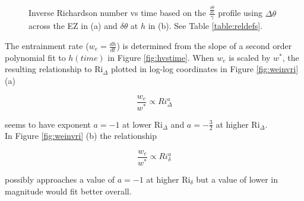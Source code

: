 \begin{figure}[htbp]

\begin{minipage}[b]{0.5\linewidth}
         
        \\
        \end{minipage}             
\quad
\begin{minipage}[b]{0.5\linewidth}
        \\
       
       \end{minipage}
        \caption[Richardson numbers based on $\frac{\frac{\partial \overline{\theta}}{\partial z}}{\gamma}$]{Inverse Richardson number vs time based on the $\frac{\frac{\partial \overline{\theta}}{\partial z}}{\gamma}$
profile using $\Delta \theta$ across the \acs{EZ} in (a) and $\delta \theta$ at $h$ in (b).  See Table \ref{table:reldefs}.}
        \label{fig:invristime}
\end{figure}

\clearpage

The entrainment rate ($w_{e}= \frac{dh}{dt}$) is determined from the slope of a second order polynomial fit to $h(time)$ in Figure \ref{fig:hvstime}.  When $w_{e}$ is scaled by $w^{*}$, the resulting relationship to \acs{Ri}$_{\Delta}$ plotted in log-log coordinates 
in Figure \ref{fig:weinvri} (a) 

\begin{equation}
\frac{w_{e}}{w^{*}} \propto Ri_{\Delta}^{a}
\end{equation}

seems to have exponent $a = -1$ at lower \acs{Ri}$_{\Delta}$ and $a = -\frac{3}{2}$ at higher \acs{Ri}$_{\Delta}$.\\

In Figure \ref{fig:weinvri} (b) the relationship

\begin{equation}
\frac{w_{e}}{w^{*}} \propto Ri_{\delta}^{a}
\end{equation}

possibly approaches a value of $a = -1$ at higher \acs{Ri}$_{\delta}$ but a value of lower in magnitude would fit better overall. \\    

